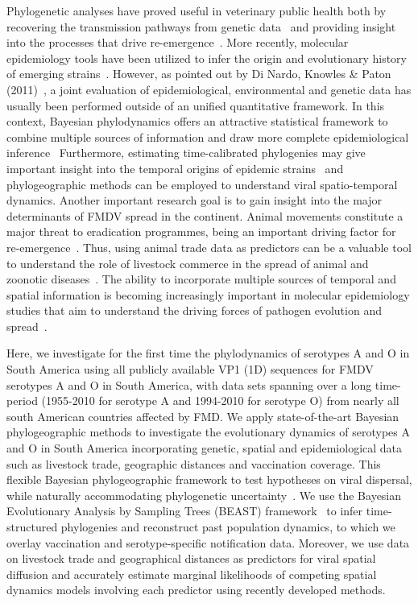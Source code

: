 \documentclass[10pt]{article}
\begin{document}
Phylogenetic analyses have proved useful in veterinary public health both by recovering the transmission pathways from genetic data~\cite{cottam2007, cottam2008} and providing insight into the processes that drive re-emergence~\cite{combining}.
More recently, molecular epidemiology tools have been utilized to infer the origin and evolutionary history of emerging strains~\cite{Perez2001, Malirat2007, andean, Malirat2011, Maradei2013}.
However, as pointed out by Di Nardo, Knowles \& Paton (2011)~\cite{combining}, a joint evaluation of epidemiological, environmental and genetic data has usually been performed outside of an unified quantitative framework.
In this context, Bayesian phylodynamics offers an attractive statistical framework to combine multiple sources of information and draw more complete epidemiological inference~\cite{grenfell, vphylodynamics}
Furthermore, estimating time-calibrated phylogenies may give important insight into the temporal origins of epidemic strains~\cite{grenfell, vphylodynamics} and phylogeographic methods can be employed to understand viral spatio-temporal dynamics.
Another important research goal is to gain insight into the major determinants of FMDV spread in the continent.
Animal movements constitute a major threat to eradication programmes, being an important driving factor for re-emergence~\cite{movements}.
Thus, using animal trade data as predictors can be a valuable tool to understand the role of livestock commerce in the spread of animal and zoonotic diseases~\cite{Nelson2011}.
The ability to incorporate multiple sources of temporal and spatial information is becoming increasingly important in molecular epidemiology studies that aim to understand the driving forces of pathogen evolution and spread~\cite{towards, combining, MEP, roots}.

Here, we investigate for the first time the phylodynamics of serotypes A and O in South America using all publicly available VP1 (1D) sequences for FMDV serotypes A and O in South America, with data sets spanning over a long time-period (1955-2010 for serotype A and 1994-2010 for serotype O) from nearly all south American countries affected by FMD.
We apply state-of-the-art Bayesian phylogeographic methods to investigate the evolutionary dynamics of serotypes A and O in South America incorporating  genetic, spatial and epidemiological data such as livestock trade, geographic distances and vaccination coverage.
This flexible Bayesian phylogeographic framework to test hypotheses on viral dispersal, while naturally accommodating phylogenetic uncertainty~\cite{roots, towards}.
We use the Bayesian Evolutionary Analysis by Sampling Trees (BEAST) framework~\cite{beast2012} to infer time-structured phylogenies and reconstruct past population dynamics, to which we overlay vaccination and serotype-specific notification data.
Moreover, we use data on livestock trade and geographical distances as predictors for viral spatial diffusion and accurately estimate marginal likelihoods of competing spatial dynamics models involving each predictor using recently developed methods.
\end{document}
